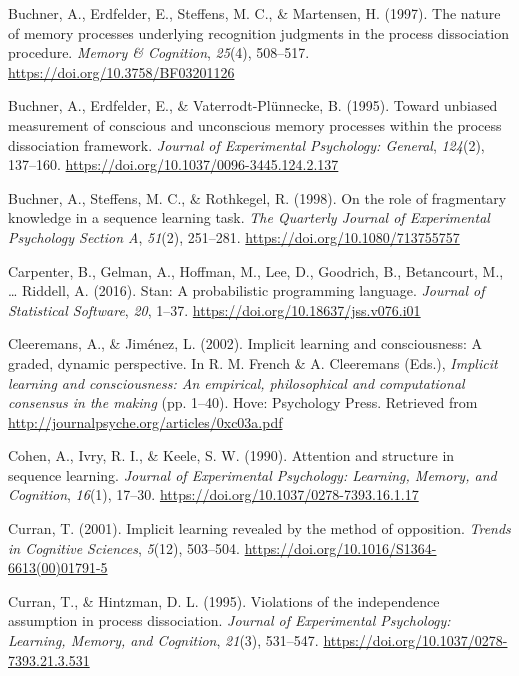 \documentclass[english,,man]{apa6}
\begin{document}
\leavevmode\hypertarget{ref-buchner_nature_1997}{}%
Buchner, A., Erdfelder, E., Steffens, M. C., \& Martensen, H. (1997). The nature of memory processes underlying recognition judgments in the process dissociation procedure. \emph{Memory \& Cognition}, \emph{25}(4), 508--517. \url{https://doi.org/10.3758/BF03201126}

\leavevmode\hypertarget{ref-buchner_toward_1995}{}%
Buchner, A., Erdfelder, E., \& Vaterrodt-Plünnecke, B. (1995). Toward unbiased measurement of conscious and unconscious memory processes within the process dissociation framework. \emph{Journal of Experimental Psychology: General}, \emph{124}(2), 137--160. \url{https://doi.org/10.1037/0096-3445.124.2.137}

\leavevmode\hypertarget{ref-buchner_role_1998}{}%
Buchner, A., Steffens, M. C., \& Rothkegel, R. (1998). On the role of fragmentary knowledge in a sequence learning task. \emph{The Quarterly Journal of Experimental Psychology Section A}, \emph{51}(2), 251--281. \url{https://doi.org/10.1080/713755757}

\leavevmode\hypertarget{ref-carpenter_stan:_2016}{}%
Carpenter, B., Gelman, A., Hoffman, M., Lee, D., Goodrich, B., Betancourt, M., \ldots{} Riddell, A. (2016). Stan: A probabilistic programming language. \emph{Journal of Statistical Software}, \emph{20}, 1--37. \url{https://doi.org/10.18637/jss.v076.i01}

\leavevmode\hypertarget{ref-cleeremans_implicit_2002}{}%
Cleeremans, A., \& Jiménez, L. (2002). Implicit learning and consciousness: A graded, dynamic perspective. In R. M. French \& A. Cleeremans (Eds.), \emph{Implicit learning and consciousness: An empirical, philosophical and computational consensus in the making} (pp. 1--40). Hove: Psychology Press. Retrieved from \url{http://journalpsyche.org/articles/0xc03a.pdf}

\leavevmode\hypertarget{ref-cohen_attention_1990}{}%
Cohen, A., Ivry, R. I., \& Keele, S. W. (1990). Attention and structure in sequence learning. \emph{Journal of Experimental Psychology: Learning, Memory, and Cognition}, \emph{16}(1), 17--30. \url{https://doi.org/10.1037/0278-7393.16.1.17}

\leavevmode\hypertarget{ref-curran_implicit_2001}{}%
Curran, T. (2001). Implicit learning revealed by the method of opposition. \emph{Trends in Cognitive Sciences}, \emph{5}(12), 503--504. \url{https://doi.org/10.1016/S1364-6613(00)01791-5}

\leavevmode\hypertarget{ref-curran_violations_1995}{}%
Curran, T., \& Hintzman, D. L. (1995). Violations of the independence assumption in process dissociation. \emph{Journal of Experimental Psychology: Learning, Memory, and Cognition}, \emph{21}(3), 531--547. \url{https://doi.org/10.1037/0278-7393.21.3.531}
\end{document}

